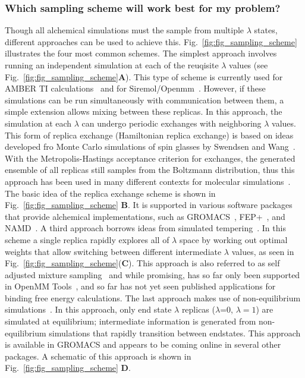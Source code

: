 \documentclass[9pt,bestpractices]{livecoms}
\begin{document}
\subsubsection{Which sampling scheme will work best for my problem?}
\label{sec:sampling_schemes}
Though all alchemical simulations must the sample from multiple $\lambda$ states, different approaches can be used to achieve this. Fig.~\ref{fig:fig_sampling_scheme} illustrates the four most common schemes. The simplest approach involves running an independent simulation at each of the reuqisite $\lambda$ values (see Fig.~\ref{fig:fig_sampling_scheme}\textbf{A}). This type of scheme is currently used for AMBER TI calculations~\cite{song2019using} and for Siremol/Openmm~\cite{hedges2019biosimspace}. However, if these simulations can be run simultaneously with communication between them, a simple extension allows mixing between these replicas. In this approach, the simulation at each $\lambda$ can undergo periodic exchanges with neighboring $\lambda$ values. This form of replica exchange (Hamiltonian replica exchange) is based on ideas developed fro Monte Carlo simulations of spin glasses by Swendsen and Wang~\cite{swendsen1986replica}. With the Metropolis-Hastings acceptance criterion for exchanges, the generated ensemble of all replicas still samples from the Boltzmann distribution, thus this approach has been used in many different contexts for molecular simulations~\cite{sugita2000multidimensionala,sugita1999replicaexchangea, woods2003developmenta, jiang2010free}. The basic idea of the replica exchange scheme is shown in Fig.~\ref{fig:fig_sampling_scheme} \textbf{B}. It is supported in various software packages that provide alchemical implementations, such as GROMACS~\cite{aldeghi2015accurate}, FEP+~\cite{wang2015accurate}, and NAMD~\cite{jiang2019computing}. A third approach borrows ideas from simulated tempering~\cite{marinari1992simulateda}. In this scheme a single replica rapidly explores all of $\lambda$ space by working out optimal weights that allow switching between different intermediate $\lambda$ values, as seen in Fig.~\ref{fig:fig_sampling_scheme}(\textbf{C}). This approach is also referred to as self adjusted mixture sampling~\cite{lyubartsev1992newa, li2007simulated, tan2017optimally} and while promising, has so far only been supported in OpenMM Tools~\cite{andrearizzi2019choderalab}, and so far has not yet seen published applications for binding free energy calculations. The last approach makes use of non-equilibrium simulations~\cite{aldeghi2018accurate}. In this approach, only end state $\lambda$ replicas ($\lambda$=0, $\lambda=1$) are simulated at equilibrium; intermediate information is generated from non-equilibrium simulations that rapidly transition between endstates. This approach is available in GROMACS and appears to be coming online in several other packages. A schematic of this approach is shown in Fig.~\ref{fig:fig_sampling_scheme} \textbf{D}. 
\end{document}
